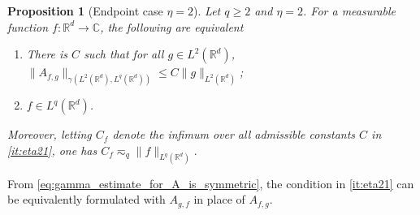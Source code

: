 \documentclass[reqno]{amsart}
\theoremstyle{plain}
\theoremstyle{remark}
\theoremstyle{plain}
\newtheorem{proposition}[theorem]{Proposition}
\numberwithin{equation}{section}
\def\R{{\mathbb R}}
\def\C{{\mathbb C}}
\newcommand{\1}{\one}
\begin{document}
\begin{proposition}[Endpoint case $\eta=2$]\label{prop:eta2}
Let $q\geq 2$ and $\eta=2$. For a measurable function $f:\R^d\to \C$, the following are equivalent 
  \begin{enumerate}[\rm (1)]
  \item\label{it:eta21} There is $C$ such that for all $g\in L^2(\R^d)$, $\|A_{f,g}\|_{\gamma(L^2(\R^d), L^q(\R^d))}\leq C \|g\|_{L^2(\R^d)}$; \item\label{it:eta23} $f\in L^q(\R^d)$. 
  \end{enumerate}
Moreover, letting $C_{f}$ denote the infimum over all admissible constants $C$ in \eqref{it:eta21}, one has 
$C_{f} \eqsim_{q}  \|f\|_{L^q(\R^d)}.$ 
\end{proposition}

From \eqref{eq:gamma_estimate_for_A_is_symmetric}, the condition in \eqref{it:eta21} can be equivalently formulated with $A_{g,f}$ in place of $A_{f,g}$.
\end{document}
